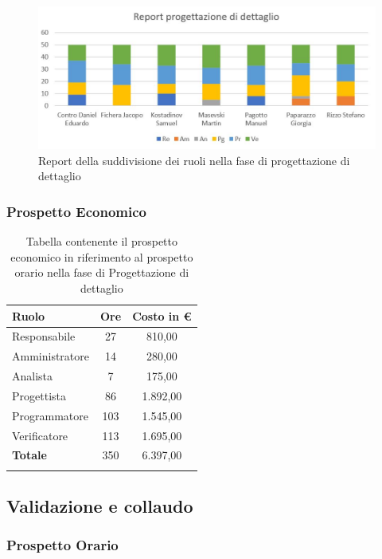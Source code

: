 \documentclass[../piano_di_progetto.tex]{subfiles}
\begin{document}
\begin{figure}[H]
\centering
\includegraphics[width=12cm]{src/img/report/report_prog_dett}
\caption{Report della suddivisione dei ruoli nella fase di progettazione di dettaglio}
\end{figure}

\subsubsection{Prospetto Economico}

\begin{center}
	\begin{longtable}{|l|c|c|}
		\hline
		\rowcolor{lightgray}
		\textbf{Ruolo} & \textbf{Ore} & \textbf{Costo in €}\\
		\hline
		Responsabile & 27 & 810,00\\
		Amministratore & 14 & 280,00\\
		Analista & 7 & 175,00\\
		Progettista & 86 & 1.892,00\\
		Programmatore & 103 & 1.545,00\\
		Verificatore & 113 & 1.695,00\\
		\hline
		\textbf{Totale} & 350 & 6.397,00\\
		\hline
		\rowcolor{white}
		\caption{Tabella contenente il prospetto economico in riferimento al prospetto orario nella fase di Progettazione di dettaglio}
	\end{longtable}
\end{center}

\subsection{Validazione e collaudo}%
\label{sub:fase_valid_collaudo}
\subsubsection{Prospetto Orario}
\end{document}
